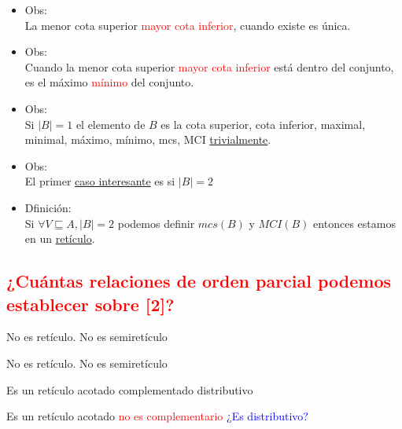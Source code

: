 \documentclass[../main.tex]{subfiles}
\begin{document}
\begin{figure}[H]
	\centering
	
\end{figure}
\begin{itemize}
	\item Obs:\\
		La menor cota superior \textcolor{red}{mayor cota inferior}, cuando existe es única.
	\item Obs:\\
		Cuando la menor cota superior \textcolor{red}{mayor cota inferior} está
		dentro del conjunto, es el máximo \textcolor{red}{mínimo} del conjunto.
	\item Obs:\\
		Si $|B|=1$ el elemento de $B$ es la cota superior, cota inferior, maximal, minimal,
		máximo, mínimo, mcs, MCI \underline{trivialmente}.
	\item Obs:\\
		El primer \underline{caso interesante} es si $|B|=2$
	\item Dfinición:\\
		Si $\forall V \sqsubseteq A, |B|=2$ podemos definir $mcs(B)$ y $MCI(B)$
		entonces estamos en un \underline{retículo}.
\end{itemize}
\textcolor{red}{\section{¿Cuántas relaciones de orden parcial podemos establecer sobre [2]?}}
\begin{figure}[H]
	\centering
	
\end{figure}

No es retículo. No es semiretículo
\begin{figure}[H]
	\centering
	
\end{figure}

No es retículo. No es semiretículo
\begin{figure}[H]
	\centering
	
\end{figure}

Es un retículo acotado complementado distributivo
\begin{figure}[H]
	\centering
	
\end{figure}

Es un retículo acotado \textcolor{red}{no es complementario}
\textcolor{blue}{¿Es distributivo?}
\begin{figure}[H]
	\centering
	
\end{figure}
\end{document}
